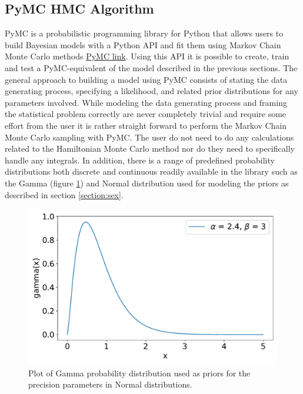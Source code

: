 \begin{example}
	\subsection{PyMC HMC Algorithm}
	PyMC is a probabilistic programming library for Python that allows users to build Bayesian models with a Python API and fit them using Markov Chain Monte Carlo methods \href{https://www.pymc.io/welcome.html}{PyMC link}. Using this API it is possible to create, train and test a PyMC-equivalent of the model described in the previous sections. The general approach to building a model using PyMC consists of stating the data generating process, specifying a likelihood, and related prior distributions for any parameters involved. While modeling the data generating process and framing the statistical problem correctly are never completely trivial and require some effort from the user it is rather straight forward to perform the Markov Chain Monte Carlo sampling with PyMC. The user do not need to do any calculations related to the Hamiltonian Monte Carlo method nor do they need to specifically handle any integrals. In addition, there is a range of predefined probability distributions both discrete and continuous readily available in the library such as the Gamma (figure \ref{fig:gamma}) and Normal distribution used for modeling the priors as described in section \ref{section:sex}.
	\begin{figure}[H]
		\centering
		\includegraphics[width = 1\textwidth]{figures/gamma_dist.pdf}
		\caption{Plot of Gamma probability distribution used as priors for the precision parameters in Normal distributions.}
		\label{fig:gamma}
	\end{figure}

\end{example}
